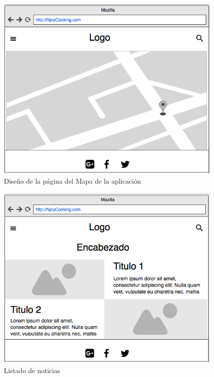 \begin{figure}
\begin{center}
\includegraphics[width=1.0\textwidth]{imagenes/mapa.png}
\caption{Diseño de la página del Mapa de la aplicación}
\label{mapa}
\end{center}
\end{figure}

\begin{figure}
\begin{center}
\includegraphics[width=1.0\textwidth]{imagenes/listado-blog.png}
\caption{Listado de noticias}
\label{listado-blog}
\end{center}
\end{figure}

